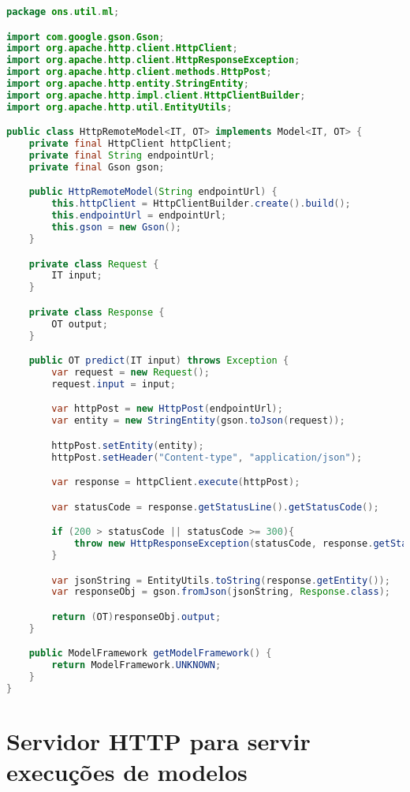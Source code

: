 \begin{lstlisting}[language=Java, caption=Implementação da classe Dl4jNativeModel, label={lst:http-remote-model}]
package ons.util.ml;

import com.google.gson.Gson;
import org.apache.http.client.HttpClient;
import org.apache.http.client.HttpResponseException;
import org.apache.http.client.methods.HttpPost;
import org.apache.http.entity.StringEntity;
import org.apache.http.impl.client.HttpClientBuilder;
import org.apache.http.util.EntityUtils;

public class HttpRemoteModel<IT, OT> implements Model<IT, OT> {
    private final HttpClient httpClient;
    private final String endpointUrl;
    private final Gson gson;

    public HttpRemoteModel(String endpointUrl) {
        this.httpClient = HttpClientBuilder.create().build();
        this.endpointUrl = endpointUrl;
        this.gson = new Gson();
    }

    private class Request {
        IT input;
    }

    private class Response {
        OT output;
    }

    public OT predict(IT input) throws Exception {
        var request = new Request();
        request.input = input;

        var httpPost = new HttpPost(endpointUrl);
        var entity = new StringEntity(gson.toJson(request));

        httpPost.setEntity(entity);
        httpPost.setHeader("Content-type", "application/json");

        var response = httpClient.execute(httpPost);

        var statusCode = response.getStatusLine().getStatusCode();

        if (200 > statusCode || statusCode >= 300){
            throw new HttpResponseException(statusCode, response.getStatusLine().getReasonPhrase());
        }

        var jsonString = EntityUtils.toString(response.getEntity());
        var responseObj = gson.fromJson(jsonString, Response.class);

        return (OT)responseObj.output;
    }

    public ModelFramework getModelFramework() {
        return ModelFramework.UNKNOWN;
    }
}
\end{lstlisting}

\section{Servidor HTTP para servir execuções de modelos}
\label{appendix-ons-http-server}

